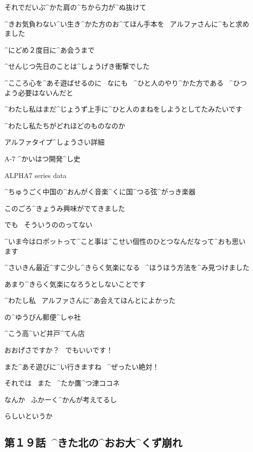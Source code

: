 \Kokone それでだいぶ^{かた}{肩}の^{ちから}{力}が^{ぬ}{抜}けて

\Kokone ^{きお}{気負}わない^{い}{生}き^{かた}{方}のお^{てほん}{手本}を
\ アルファさんに^{もと}{求}めました

\Kokone ^{にどめ}{２度目}に^{あ}{会}うまで

\page
\Kokone ^{せんじつ}{先日}のことは^{しょうげき}{衝撃}でした

\Kokone ^{こころ}{心}を^{あそ}{遊}ばせるのに
\ なにも
\ ^{ひと}{人}のやり^{かた}{方}である
\ ^{ひつよう}{必要}はないんだと

\Kokone ^{わたし}{私}はまだ^{じょうず}{上手}に^{ひと}{人}のまねをしようとしてたみたいです

\page
\Kokone ^{わたし}{私}たちがどれほどのものなのか

\Sign アルファタイプ^{しょうさい}{詳細}

\Sign A-7 ^{かいはつ}{開発}^{し}{史}

\Sign ALPHA7 series data

\Sign ^{ちゅうごく}{中国}の^{おんがく}{音楽}^{くに}{国}^{つる}{弦}^{がっき}{楽器}

\page
\Kokone このごろ^{きょうみ}{興味}がでてきました

\Kokone でも
\ そういうののってない

\Kokone ^{いま}{今}はロボットって^{こと}{事}は^{こせい}{個性}のひとつなんだなって^{おも}{思}います

\page
\Kokone ^{さいきん}{最近}^{すこ}{少}し^{きらく}{気楽}になる
\ ^{ほうほう}{方法}を^{み}{見}つけました

\Kokone あまり^{きらく}{気楽}になろうとしないことです

\page
\Kokone ^{わたし}{私}
\ アルファさんに^{あ}{会}えてほんとによかった

\Sign の^{ゆうびん}{郵便}^{しゃ}{社}

\Sign ^{こう}{高}^{いど}{井戸}^{てん}{店}

\Kokone おおげさですか？
\ でもいいです！

\page
\Kokone また^{あそ}{遊}びに^{い}{行}きますね
\ ^{ぜったい}{絶対}！

\page
\Kokone それでは
\ また
\ ^{たか}{鷹}^{つ}{津}ココネ

\Alpha なんか
\ ふかーく^{かんが}{考}えてるし

\Alpha らしいというか


\subsection{第１９話\ ^{きた}{北}の^{おお}{大}^{くず}{崩}れ}

